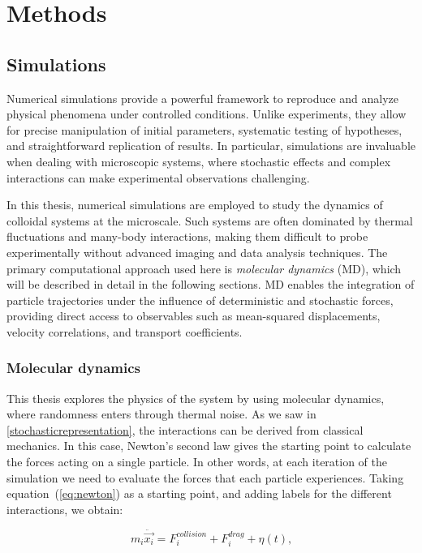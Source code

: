 \part{Methods}
\label{part:methods}

\chapter{Simulations}

Numerical simulations provide a powerful framework to reproduce and analyze physical phenomena under controlled conditions. Unlike experiments, they allow for precise manipulation of initial parameters, systematic testing of hypotheses, and straightforward replication of results. In particular, simulations are invaluable when dealing with microscopic systems, where stochastic effects and complex interactions can make experimental observations challenging. 

In this thesis, numerical simulations are employed to study the dynamics of colloidal systems at the microscale. Such systems are often dominated by thermal fluctuations and many-body interactions, making them difficult to probe experimentally without advanced imaging and data analysis techniques. The primary computational approach used here is \textit{molecular dynamics} (MD), which will be described in detail in the following sections. MD enables the integration of particle trajectories under the influence of deterministic and stochastic forces, providing direct access to observables such as mean-squared displacements, velocity correlations, and transport coefficients.

\section{Molecular dynamics}



This thesis explores the physics of the system by using molecular dynamics, where randomness enters through thermal noise. As we saw in \ref{stochasticrepresentation}, the interactions can be derived from classical mechanics. In this case, Newton’s second law gives the starting point to calculate the forces acting on a single particle. In other words, at each iteration of the simulation we need to evaluate the forces that each particle experiences. Taking equation~(\ref{eq:newton}) as a starting point, and adding labels for the different interactions, we obtain:

\begin{equation}
  m_i\ddot{\vec{x_i}} = F^{collision}_i + F^{drag}_i + \eta(t)\text{,}
  \label{eq:langevinratchet}
\end{equation}

